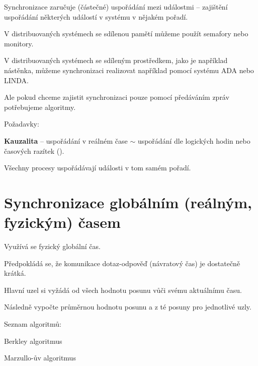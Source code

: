 \begin{compactitem}
    \item Synchronizace zaručuje (částečné) uspořádání mezi událostmi -- zajištění uspořádání některých událostí v systému v nějakém pořadí.

    \item V distribuovaných systémech se sdílenou pamětí můžeme použít semafory nebo monitory.

    \item V distribuovaných systémech se sdíleným prostředkem, jako je například nástěnka, můžeme synchronizaci realizovat například pomocí systému ADA nebo LINDA.

    \item Ale pokud chceme zajistit synchronizaci pouze pomocí předáváním zpráv potřebujeme algoritmy.

    \item Požadavky: \begin{compactitem}
        \item \textbf{Kauzalita} -- uspořádání v reálném čase $\sim$ uspořádání dle logických hodin nebo časových razítek ().
        \item Všechny procesy uspořádávají události v tom samém pořadí.
    \end{compactitem}
\end{compactitem}


\section{Synchronizace globálním (reálným, fyzickým) časem}

\begin{compactitem}
    \item Využívá se fyzický globální čas.
    \item Předpokládá se, že komunikace dotaz-odpověď (návratový čas) je dostatečně krátká.
    \item Hlavní uzel si vyžádá od všech hodnotu posunu vůči svému aktuálnímu času.
    \item Následně vypočte průměrnou hodnotu posunu a z té posuny pro jednotlivé uzly.

    \item Seznam algoritmů: \begin{compactitem}
        \item Berkley algoritmus
        \item Marzullo-ův algoritmus
    \end{compactitem}
\end{compactitem}

